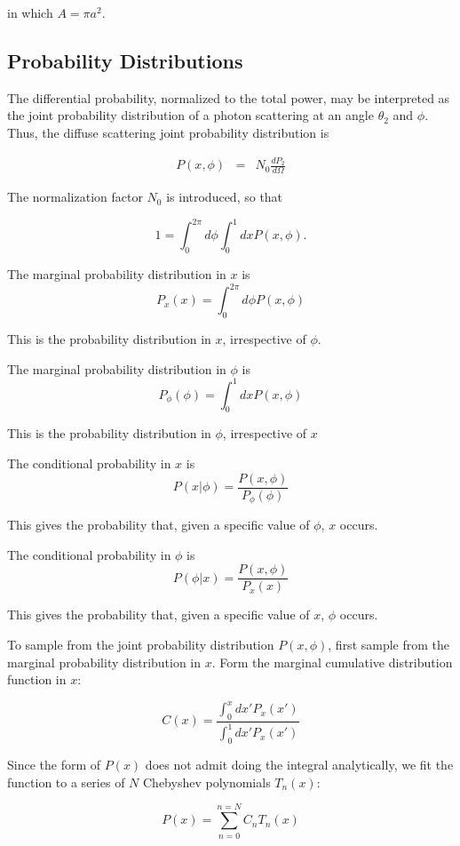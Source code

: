 \documentclass[11pt]{article}
\newcommand{\der}[2]{\frac{d {#1}}{d {#2}}}
\begin{document}
{{{{ in which $A=\pi a^{2}.$

\subsection{Probability Distributions}

The differential probability, normalized to the total power, may be interpreted as the joint probability distribution of a photon scattering at an angle $\theta_{2}$ and $\phi$.  Thus, the diffuse scattering joint probability distribution is

\begin{eqnarray}
P(x,\phi)&=&N_{0}\der{P_{2}}{\Omega}\end{eqnarray}

The normalization factor $N_{0}$ is introduced, so that

$$1=\int_{0}^{2\pi}d\phi\int_{0}^{1}dxP(x,\phi).$$


The marginal probability distribution in $x$ is
$$P_{x}(x)=\int_{0}^{2\pi}d\phi P(x,\phi)$$

This is the probability distribution in $x$, irrespective of $\phi.$

The marginal probability distribution in $\phi$ is
$$P_{\phi}(\phi)=\int_{0}^{1}dxP(x,\phi)$$

This is the probability distribution in $\phi$, irrespective of $x$

The conditional probability in $x$ is 
$$P(x|\phi)=\frac{P(x,\phi)}{P_{\phi}(\phi)}$$

This gives the probability that, given a specific value of $\phi$, $x$ occurs. 

The conditional probability in $\phi$ is 
$$P(\phi|x)=\frac{P(x,\phi)}{P_{x}(x)}$$

This gives the probability that, given a specific value of $x$, $\phi$ occurs. 


To sample from the joint probability distribution $P(x,\phi)$, first
sample from the marginal probability distribution in $x$. Form the
marginal cumulative distribution function in $x$:

$$C(x)=\frac{\int_{0}^{x}dx'P_{x}(x')}{\int_{0}^{1}dx'P_{x}(x')}$$

Since the form of $P(x)$ does not admit doing the integral
analytically, we fit the function to a series of $N$ Chebyshev
polynomials $T_{n}(x)$:

$$P(x)=\sum_{n=0}^{n=N}C_{n}T_{n}(x)$$

}}}}
\end{document}
